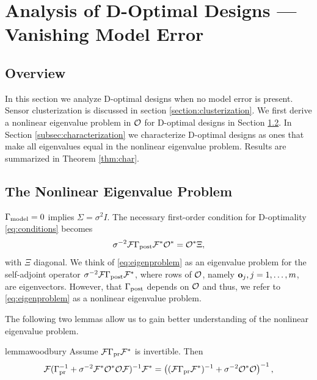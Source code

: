 \section{Analysis of D-Optimal Designs --- Vanishing Model Error}\label{section:vanishing}
\subsection{Overview}
In this section we analyze D-optimal designs when no model error is
present. Sensor clusterization is discussed in section
\ref{section:clusterization}. We first derive a nonlinear eigenvalue
problem in $\mathcal{O}$ for D-optimal designs in Section
\ref{subsec:eigenproblem}. In Section \ref{subsec:characterization} we
characterize D-optimal designs as ones that make all eigenvalues equal
in the nonlinear eigenvalue problem. Results are summarized in Theorem
\ref{thm:char}.


\subsection{The Nonlinear Eigenvalue Problem}\label{subsec:eigenproblem}
$\Gamma_{\textup{model}} = 0$ implies $\Sigma= \sigma^2I$. The necessary first-order
condition for D-optimality \eqref{eq:conditions} becomes
\begin{equation}\label{eq:eigenproblem}
  \sigma^{-2}\fwd \postcov \fwd^* \obs^* = \obs^* \Xi,
\end{equation}
with $\Xi$ diagonal. We think of \eqref{eq:eigenproblem} as an
eigenvalue problem for the self-adjoint operator $\sigma^{-2}\mathcal{F}
\Gamma_{\textup{post}} \mathcal{F}^*$, where rows of $\mathcal{O}$, namely $\mathbf{o}_j,j=1,\dots, m$,
are eigenvectors. However, that $\Gamma_{\textup{post}}$ depends on $\mathcal{O}$ and thus,
we refer to \eqref{eq:eigenproblem} as a nonlinear eigenvalue problem.

The following two lemmas allow us to gain better understanding of the
nonlinear eigenvalue problem.

\begin{restatable*}{lemma}{woodbury}\label{lemma:twice woodbury}
  Assume $\mathcal{F} \Gamma_{\textup{pr}} \mathcal{F}^*$ is invertible. Then
  \begin{align*}
    \begin{split}
      \fwd( \prcov^{-1} + \sigma^{-2}  \fwd^* \obs^* \obs \fwd )^{-1} \fwd^* 
      = \left ( (\fwd\prcov\fwd^*)^{-1} + \sigma^{-2}  \obs^* \obs \right )^{-1},
    \end{split}
  \end{align*}  
\end{restatable*}


